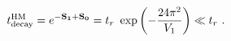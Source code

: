 \begin{equation}\label{decaytimeHM}
t^{\rm HM}_{\rm decay} = e^{-\bf S_1+\bf S_0} = t_r \ \exp\left(-{24\pi^2\over V_1}\right) \ll t_r\ .
\end{equation}

